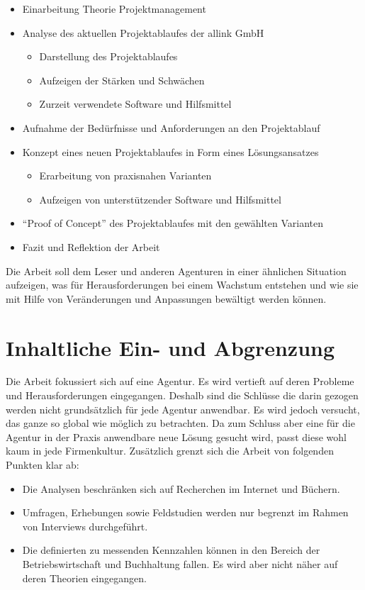 \begin{itemize}
    \item Einarbeitung Theorie Projektmanagement
    \item Analyse des aktuellen Projektablaufes der allink GmbH
    \begin{itemize}
        \item Darstellung des Projektablaufes
        \item Aufzeigen der Stärken und Schwächen
        \item Zurzeit verwendete Software und Hilfsmittel
    \end{itemize}
    \item Aufnahme der Bedürfnisse und Anforderungen an den Projektablauf
    \item Konzept eines neuen Projektablaufes in Form eines Lösungsansatzes
    \begin{itemize}
        \item Erarbeitung von praxisnahen Varianten
        \item Aufzeigen von unterstützender Software und Hilfsmittel
    \end{itemize}
    \item ``Proof of Concept'' des Projektablaufes mit den gewählten Varianten
    \item Fazit und Reflektion der Arbeit
\end{itemize}

Die Arbeit soll dem Leser und anderen Agenturen in einer ähnlichen Situation
aufzeigen, was für Herausforderungen bei einem Wachstum entstehen und wie
sie mit Hilfe von Veränderungen und Anpassungen bewältigt werden können.

\section{Inhaltliche Ein- und Abgrenzung}
Die Arbeit fokussiert sich auf eine Agentur. Es wird vertieft auf deren Probleme
und Herausforderungen eingegangen. Deshalb sind die Schlüsse die darin gezogen
werden nicht grundsätzlich für jede Agentur anwendbar. Es wird jedoch versucht, das
ganze so global wie möglich zu betrachten. Da zum Schluss aber eine für die
Agentur in der Praxis anwendbare neue Lösung gesucht wird, passt diese wohl
kaum in jede Firmenkultur. 
Zusätzlich grenzt sich die Arbeit von folgenden Punkten klar ab:

\begin{itemize}
    \item Die Analysen beschränken sich auf Recherchen im Internet und Büchern.
    \item Umfragen, Erhebungen sowie Feldstudien werden nur begrenzt im Rahmen
        von Interviews durchgeführt.
    \item Die definierten zu messenden Kennzahlen können in den Bereich der Betriebswirtschaft
        und Buchhaltung fallen. Es wird aber nicht näher auf deren Theorien eingegangen.
\end{itemize}

